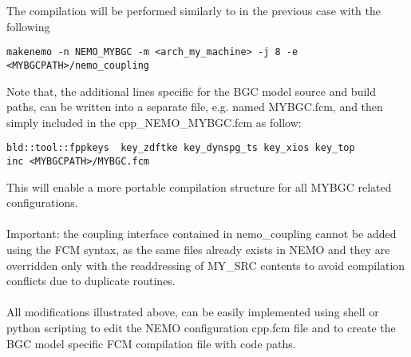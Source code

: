 \documentclass[../main/TOP_manual]{subfiles}
\begin{document}
The compilation will be performed similarly to in the previous case with the following

\begin{verbatim}
makenemo -n NEMO_MYBGC -m <arch_my_machine> -j 8 -e <MYBGCPATH>/nemo_coupling
\end{verbatim}

Note that, the additional lines specific for the BGC model source and build paths, can be written into a separate file, e.g. named MYBGC.fcm, and then simply included in the cpp\_NEMO\_MYBGC.fcm as follow:

\begin{verbatim}
bld::tool::fppkeys  key_zdftke key_dynspg_ts key_xios key_top
inc <MYBGCPATH>/MYBGC.fcm
\end{verbatim}

This will enable a more portable compilation structure for all MYBGC related configurations.  \\ \\

Important: the coupling interface contained in nemo\_coupling cannot be added using the FCM syntax, as the same files already exists in NEMO and they are overridden only with the readdressing of MY\_SRC contents to avoid compilation conflicts due to duplicate routines.  \\ \\

All modifications illustrated above, can be easily implemented using shell or python scripting to edit the NEMO configuration cpp.fcm file and to create the BGC model specific FCM compilation file with code paths.
\end{document}

